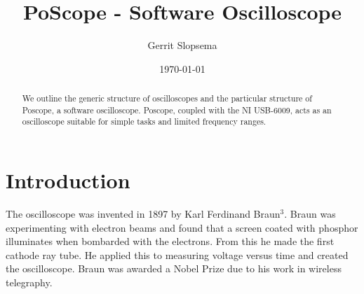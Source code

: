 \documentclass[12pt,reqno]{amsart}
\begin{document}
\newcommand{\pdiff}[2]{\frac{\partial #1}{\partial #2}}
\newcommand{\mytime}{\: \textrm{s}}
\newcommand{\length}{\: \textrm{cm}}
\newcommand{\vel}{\: \frac{\textrm{cm}}{\textrm{s}}}
\newcommand{\mass}{\: \textrm{g}}
\newcommand{\vol}{\: \textrm{cm}^3}
\newcommand{\dens}{\: \frac{\textrm{g}}{\textrm{cm}^3}}
\newcommand{\visc}{\: \frac{\textrm{g}}{\textrm{cm}\cdot\textrm{s}}}
\newcommand{\viscSI}{\: \textrm{Pa}\cdot\textrm{s}}
\newcommand{\abs}[1]{\left| #1 \right|}




\newcommand{\hickman}{${}^1$}
\newcommand{\nidaq}{${}^2$}
\newcommand{\nobel}{${}^3$}

\newcommand{\device}{NI USB-6009}
\newcommand{\progname}{Poscope}
\newcommand{\tdiv}{t_{div}}
\newcommand{\vdiv}{V_{div}}
\newcommand{\sps}{\:\frac{\textrm{samples}}{\textrm{second}}}

\author{Gerrit Slopsema}
\title{PoScope - Software Oscilloscope}
\date{\today}
\begin{abstract}
  We outline the generic structure of oscilloscopes and the particular structure of \progname{}, a software oscilloscope. \progname{}, coupled with the \device{}, acts as an oscilloscope suitable for simple tasks and limited frequency ranges.
\end{abstract}
\maketitle

\section{Introduction}

The oscilloscope was invented in 1897 by Karl Ferdinand Braun\nobel{}. Braun was experimenting with electron beams and found that a screen coated with phosphor illuminates when bombarded with the electrons. From this he made the first cathode ray tube. He applied this to measuring voltage versus time and created the oscilloscope. Braun was awarded a Nobel Prize due to his work in wireless telegraphy.
\end{document}
